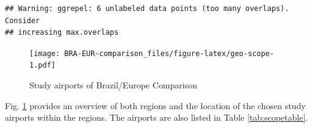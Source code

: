 \documentclass[
]{book}
\begin{document}
\begin{verbatim}
## Warning: ggrepel: 6 unlabeled data points (too many overlaps). Consider
## increasing max.overlaps
\end{verbatim}

\begin{figure}
\centering
\texttt{[image: BRA-EUR-comparison\_files/figure-latex/geo-scope-1.pdf]}
\caption{\label{fig:geo-scope}Study airports of Brazil/Europe Comparison}
\end{figure}

Fig. \ref{fig:geo-scope} provides an overview of both regions and the location of the chosen study airports within the regions. The airports are also listed in Table \ref{tab:scopetable}.



\providecommand{\docline}[3]{\noalign{\global\setlength{\arrayrulewidth}{#1}}\arrayrulecolor[HTML]{#2}\cline{#3}}

\setlength{\tabcolsep}{2pt}

\renewcommand*{\arraystretch}{1.5}
\end{document}
